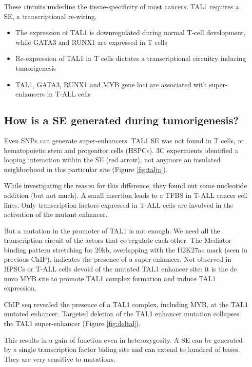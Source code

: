 These circuits underline the tissue-specificity of most cancers. TAL1 requires a SE, a transcriptional re-wiring.
\begin{itemize}
\item The expression of TAL1 is downregulated during normal T-cell development, while GATA3 and RUNX1 are expressed in T cells
\item  Re-expression of TAL1 in T cells dictates a transcriptional circuitry inducing tumorigenesis
\item TAL1, GATA3, RUNX1 and MYB gene loci are associated with super-enhancers in T-ALL cells
\end{itemize}

\hypertarget{how-is-a-se-generated-during-tumorigenesis}{%
\subsection{How is a SE generated during tumorigenesis?}\label{how-is-a-se-generated-during-tumorigenesis}}

Even SNPs can generate super-enhancers. TAL1 SE was not found in T cells, or hematopoietic stem and progenitor cells (HSPCs). 3C experiments identified a looping interaction within the SE (red arrow), not anymore an insulated neighborhood in this particular site (Figure \ref{fig:talju}).

While investigating the reason for this difference, they found out some nucleotide addition (but not much). A small insertion leads to a TFBS in T-ALL cancer cell lines. Only transcription factors expressed in T-ALL cells are involved in the activation of the mutant enhancer.

But a mutation in the promoter of TAL1 is not enough. We need all the transcription circuit of the actors that co-regulate each-other. The Mediator binding pattern stretching for 20kb, overlapping with the H2K27ac mark (seen in previous ChIP), indicates the presence of a super-enhancer. Not observed in HPSCs or T-ALL cells devoid of the mutated TAL1 enhancer site: it is the de novo MYB site to promote TAL1 complex formation and induce TAL1 expression.

ChIP seq revealed the presence of a TAL1 complex, including MYB, at the TAL1 mutated enhancer.
Targeted deletion of the TAL1 enhancer mutation collapses the TAL1 super-enhancer (Figure \ref{fig:deltal}).

This results in a gain of function even in heterozygosity. A SE can be generated by a single transcription factor biding site and can extend to hundred of bases. They are very sensitive to mutations.

